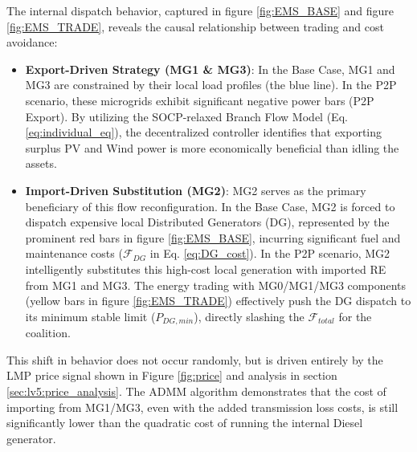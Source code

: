 \documentclass[preprint,12pt]{elsarticle}
\begin{document}
    The internal dispatch behavior, captured in figure \ref{fig:EMS_BASE} and figure \ref{fig:EMS_TRADE}, reveals the causal relationship between trading and cost avoidance:
    \begin{itemize}
        \item \textbf{Export-Driven Strategy (MG1 \& MG3)}: In the Base Case, MG1 and MG3 are constrained by their local load profiles (the blue line). In the P2P scenario, these microgrids exhibit significant negative power bars (P2P Export). By utilizing the SOCP-relaxed Branch Flow Model (Eq.\eqref{eq:individual_eq}), the decentralized controller identifies that exporting surplus PV and Wind power is more economically beneficial than idling the assets.
        \item \textbf{Import-Driven Substitution (MG2)}: MG2 serves as the primary beneficiary of this flow reconfiguration. In the Base Case, MG2 is forced to dispatch expensive local Distributed Generators (DG), represented by the prominent red bars in figure \ref{fig:EMS_BASE}, incurring significant fuel and maintenance costs ($\mathcal{F}_{DG}$ in Eq. \eqref{eq:DG_cost}). In the P2P scenario, MG2 intelligently substitutes this high-cost local generation with imported RE from MG1 and MG3. The energy trading with MG0/MG1/MG3 components (yellow bars in figure \ref{fig:EMS_TRADE}) effectively push the DG dispatch to its minimum stable limit ($P_{DG,min}$), directly slashing the $\mathcal{F}_{total}$ for the coalition.
    \end{itemize}
    This shift in behavior does not occur randomly, but is driven entirely by the LMP price signal shown in Figure \ref{fig:price} and analysis in section \ref{sec:lv5:price_analysis}. The ADMM algorithm demonstrates that the cost of importing from MG1/MG3, even with the added transmission loss costs, is still significantly lower than the quadratic cost of running the internal Diesel generator.
\end{document}

